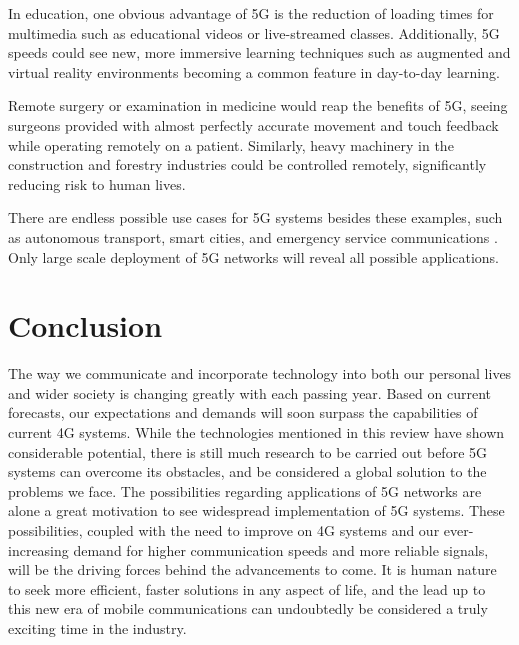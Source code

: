 \documentclass[journal]{IEEEtran}
\begin{document}
In education, one obvious advantage of 5G is the reduction of loading times for multimedia such as educational videos or live-streamed classes. Additionally, 5G speeds could see new, more immersive learning techniques such as augmented and virtual reality environments becoming a common feature in day-to-day learning.

Remote surgery or examination in medicine would reap the benefits of 5G, seeing surgeons provided with almost perfectly accurate movement and touch feedback while operating remotely on a patient. \cite{wp5g} Similarly, heavy machinery in the construction and forestry industries could be controlled remotely, significantly reducing risk to human lives.

There are endless possible use cases for 5G systems besides these examples, such as autonomous transport, smart cities, and emergency service communications \cite{wp5g}. Only large scale deployment of 5G networks will reveal all possible applications.

\section{Conclusion}
The way we communicate and incorporate technology into both our personal lives and wider society is changing greatly with each passing year. Based on current forecasts, our expectations and demands will soon surpass the capabilities of current 4G systems. While the technologies mentioned in this review have shown considerable potential, there is still much research to be carried out before 5G systems can overcome its obstacles, and be considered a global solution to the problems we face. The possibilities regarding applications of 5G networks are alone a great motivation to see widespread implementation of 5G systems. These possibilities, coupled with the need to improve on 4G systems and our ever-increasing demand for higher communication speeds and more reliable signals, will be the driving forces behind the advancements to come. It is human nature to seek more efficient, faster solutions in any aspect of life, and the lead up to this new era of mobile communications can undoubtedly be considered a truly exciting time in the industry.

\bigskip

\printbibliography
\end{document}
